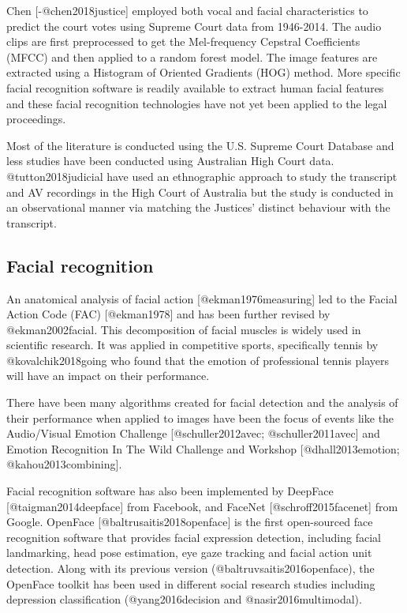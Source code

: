 \documentclass{monashthesis}
\begin{document}
Chen {[}-@chen2018justice{]} employed both vocal and facial characteristics to predict the court votes using Supreme Court data from 1946-2014. The audio clips are first preprocessed to get the Mel-frequency Cepstral Coefficients (MFCC) and then applied to a random forest model. The image features are extracted using a Histogram of Oriented Gradients (HOG) method. More specific facial recognition software is readily available to extract human facial features and these facial recognition technologies have not yet been applied to the legal proceedings.

Most of the literature is conducted using the U.S. Supreme Court Database and less studies have been conducted using Australian High Court data. @tutton2018judicial have used an ethnographic approach to study the transcript and AV recordings in the High Court of Australia but the study is conducted in an observational manner via matching the Justices' distinct behaviour with the transcript.

\hypertarget{facial-recognition}{%
\subsection{Facial recognition}\label{facial-recognition}}

An anatomical analysis of facial action {[}@ekman1976measuring{]} led to the Facial Action Code (FAC) {[}@ekman1978{]} and has been further revised by @ekman2002facial. This decomposition of facial muscles is widely used in scientific research. It was applied in competitive sports, specifically tennis by @kovalchik2018going who found that the emotion of professional tennis players will have an impact on their performance.

There have been many algorithms created for facial detection and the analysis of their performance when applied to images have been the focus of events like the Audio/Visual Emotion Challenge {[}@schuller2012avec; @schuller2011avec{]} and Emotion Recognition In The Wild Challenge and Workshop {[}@dhall2013emotion; @kahou2013combining{]}.

Facial recognition software has also been implemented by DeepFace {[}@taigman2014deepface{]} from Facebook, and FaceNet {[}@schroff2015facenet{]} from Google. OpenFace {[}@baltrusaitis2018openface{]} is the first open-sourced face recognition software that provides facial expression detection, including facial landmarking, head pose estimation, eye gaze tracking and facial action unit detection. Along with its previous version (@baltruvsaitis2016openface), the OpenFace toolkit has been used in different social research studies including depression classification (@yang2016decision and @nasir2016multimodal).
\end{document}
